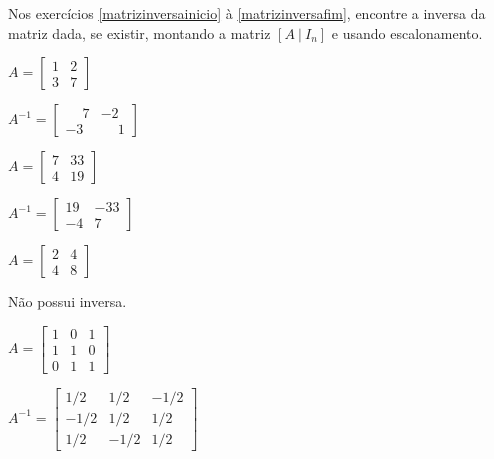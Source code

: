 \documentclass[12pt]{exam}
\begin{document}
Nos exercícios \ref{matrizinversainicio} à \ref{matrizinversafim}, encontre a inversa da matriz dada, se existir, montando a matriz $[A\ |\ I_n]$ e usando escalonamento.

\begin{exercicio}\label{matrizinversainicio}
  $
    A =\begin{bmatrix}
        1 & 2\\
        3 & 7
    \end{bmatrix}
  $
  \begin{solucao}
    $A^{-1} =\begin{bmatrix}
      \phantom{-} 7 & -2\\
      -3 & \phantom{-} 1
    \end{bmatrix}$
  \end{solucao}
\end{exercicio}

\begin{exercicio}
  $
    A =\begin{bmatrix}
        7 & 33\\
        4 & 19
    \end{bmatrix}
  $
  \begin{solucao}
    $A^{-1} =\begin{bmatrix}
      19 & -33\\
      -4 & 7
    \end{bmatrix}$
  \end{solucao}
\end{exercicio}


\begin{exercicio}
  $
    A =\begin{bmatrix}
        2 & 4\\
        4 & 8
    \end{bmatrix}
  $
  \begin{solucao}
    Não possui inversa.
  \end{solucao}
\end{exercicio}

\begin{exercicio}
    $
        A = \begin{bmatrix}
                1 & 0 & 1\\
                1 & 1 & 0\\
                0 & 1 & 1
             \end{bmatrix}
    $
    \begin{solucao}
        $
            A^{-1} = \begin{bmatrix}
                        1/2 & 1/2 & -1/2\\
                        -1/2 & 1/2 & 1/2\\
                        1/2 & -1/2 & 1/2
                    \end{bmatrix}
         $
     \end{solucao}
\end{exercicio}
\end{document}
